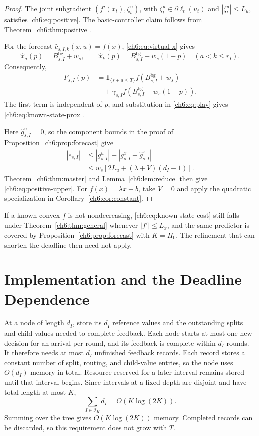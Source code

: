 \documentclass[11pt]{article}
\newcommand{\ind}[1]{\mathbf{1}_{\{#1\}}}
\theoremstyle{plain}
\theoremstyle{remark}
\numberwithin{equation}{section}
\begin{document}
\begin{proof}
The joint subgradient $(f'(x_t),\zeta_t^u)$, with
$\zeta_t^u\in\partial\ell_t(u_t)$ and $|\zeta_t^u|\le L_u$, satisfies
\eqref{ch6:eq:positive}.  The basic-controller claim follows from
Theorem~\ref{ch6:thm:positive}.

For the forecast $\widehat c_{s,I,k}(x,u)=f(x)$,
\eqref{ch6:eq:virtual-x} gives
\[
\widehat x_a(p)=B_{s,I}^{\mathrm{bg}}+w_s,
\qquad
\widehat x_k(p)=B_{s,I}^{\mathrm{bg}}+w_s(1-p)
\quad(a<k\le r_I).
\]
Consequently,
\begin{align*}
F_{s,I}(p)
&=\ind{s+a\le T}f(B_{s,I}^{\mathrm{bg}}+w_s)\\
&\quad+\gamma_{s,I}
 f(B_{s,I}^{\mathrm{bg}}+w_s(1-p)).
\end{align*}
The first term is independent of $p$, and substitution in
\eqref{ch6:eq:play} gives \eqref{ch6:eq:known-state-prox}.

Here $\widehat g_{s,I}^u=0$, so the component bounds in the proof of
Proposition~\ref{ch6:prop:forecast} give
\begin{align*}
|e_{s,I}|
&\le|g_{s,I}^u|
  +|g_{s,I}^x-\widehat g_{s,I}^x|\\
&\le w_s[2L_u+(\lambda+V)(d_I-1)].
\end{align*}
Theorem~\ref{ch6:thm:master} and Lemma~\ref{ch6:lem:reduce} then give
\eqref{ch6:eq:positive-upper}.
For $f(x)=\lambda x+b$, take $V=0$ and apply the quadratic specialization
in Corollary~\ref{ch6:cor:constant}.
\end{proof}

If a known convex
$f$ is not nondecreasing, \eqref{ch6:eq:known-state-cost} still falls under
Theorem~\ref{ch6:thm:general} whenever $|f'|\le L_x$, and the same
predictor is covered by Proposition~\ref{ch6:prop:forecast} with $K=H_0$.
The refinement that can shorten the deadline then need not apply.

\section{Implementation and the Deadline Dependence}
\label{ch6:sec:implementation}
At a node of length $d_I$, store its $d_I$ reference values and the outstanding
splits and child values needed to complete feedback. Each node starts at
most one new decision for an arrival per round, and its feedback is complete
within $d_I$ rounds. It therefore needs at most $d_I$ unfinished feedback
records. Each record stores a constant number of split, routing, and
child-value entries, so the node uses $O(d_I)$ memory in total. Resource
reserved for a later interval remains stored until that interval begins.
Since intervals at a fixed depth are disjoint and have total length at most $K$,
\begin{equation}\label{ch6:eq:memory}
 \sum_{I\in\mathcal{I}_K}d_I=O(K\log(2K)).
\end{equation}
Summing over the tree gives $O(K\log(2K))$ memory. Completed records can
be discarded, so this requirement does not grow with $T$.
\end{document}
